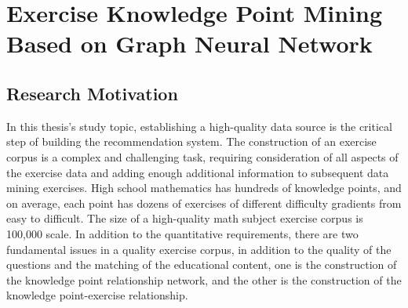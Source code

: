 
\chapter{Exercise Knowledge Point Mining Based on Graph Neural Network}

\ifpdf
    \graphicspath{{Chapter2/Figs/Raster/}{Chapter2/Figs/PDF/}{Chapter2/Figs/}}
\else
    \graphicspath{{Chapter2/Figs/Vector/}{Chapter2/Figs/PDF/}{Chapter2/Figs/}}
\fi


\section{Research Motivation}

In this thesis's study topic, establishing a high-quality data source is the critical step of building the recommendation system. The construction of an exercise corpus is a complex and challenging task, requiring consideration of all aspects of the exercise data and adding enough additional information to subsequent data mining exercises. High school mathematics has hundreds of knowledge points, and on average, each point has dozens of exercises of different difficulty gradients from easy to difficult. The size of a high-quality math subject exercise corpus is 100,000 scale. In addition to the quantitative requirements, there are two fundamental issues in a quality exercise corpus, in addition to the quality of the questions and the matching of the educational content, one is the construction of the knowledge point relationship network, and the other is the construction of the knowledge point-exercise relationship.

